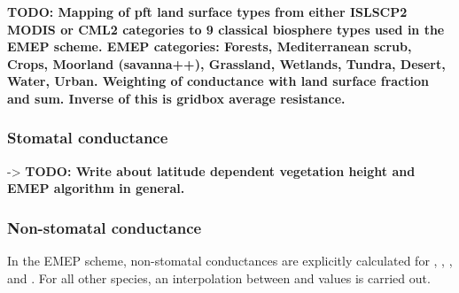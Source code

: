 \documentclass[gmd, manuscript]{copernicus}
\begin{document}
{\bf TODO: Mapping of pft land surface types from either ISLSCP2 MODIS or CML2 categories to 9 classical biosphere types used in the EMEP scheme. EMEP categories: Forests, Mediterranean scrub, Crops, Moorland (savanna++), Grassland, Wetlands, Tundra, Desert, Water, Urban. Weighting of conductance with land surface fraction and sum. Inverse of this is gridbox average resistance.}
\subsubsection*{Stomatal conductance}
-> \citep{ICP:MappingManual2017}
{\bf TODO: Write about latitude dependent vegetation height and EMEP algorithm in general.}
\subsubsection*{Non-stomatal conductance}
In the EMEP scheme, non-stomatal conductances are explicitly calculated for , , , and . For all other species, an interpolation between  and  values is carried out.
\end{document}
